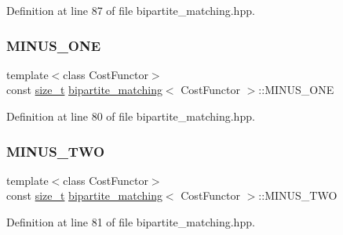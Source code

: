 Definition at line 87 of file bipartite\+\_\+matching.\+hpp.

\mbox{\label{classbipartite__matching_a5b153ca3c9f9845d979581a26b3b9f39}} 
\subsubsection{\texorpdfstring{M\+I\+N\+U\+S\+\_\+\+O\+NE}{MINUS\_ONE}}
{\footnotesize\ttfamily template$<$class Cost\+Functor$>$ \\
const \hyperlink{tutorial__fpt__2017_2intro_2sixth_2test_8c_a7c94ea6f8948649f8d181ae55911eeaf}{size\+\_\+t} \hyperlink{classbipartite__matching}{bipartite\+\_\+matching}$<$ Cost\+Functor $>$\+::M\+I\+N\+U\+S\+\_\+\+O\+NE\hspace{0.3cm}{\ttfamily [private]}}



Definition at line 80 of file bipartite\+\_\+matching.\+hpp.

\mbox{\label{classbipartite__matching_a12c5f80e06ec936b5e4e098e47477ca2}} 
\subsubsection{\texorpdfstring{M\+I\+N\+U\+S\+\_\+\+T\+WO}{MINUS\_TWO}}
{\footnotesize\ttfamily template$<$class Cost\+Functor$>$ \\
const \hyperlink{tutorial__fpt__2017_2intro_2sixth_2test_8c_a7c94ea6f8948649f8d181ae55911eeaf}{size\+\_\+t} \hyperlink{classbipartite__matching}{bipartite\+\_\+matching}$<$ Cost\+Functor $>$\+::M\+I\+N\+U\+S\+\_\+\+T\+WO\hspace{0.3cm}{\ttfamily [private]}}



Definition at line 81 of file bipartite\+\_\+matching.\+hpp.

\mbox{\label{classbipartite__matching_adb1e20a688d08336d1af827da77ad7a5}} 
